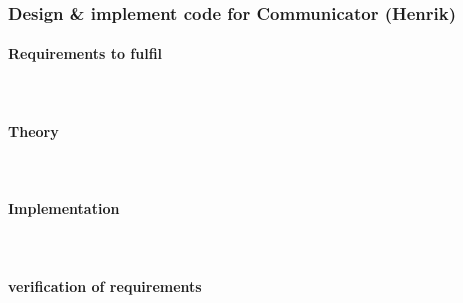 
\subsubsection{Design \& implement code for Communicator (Henrik)}
\paragraph{Requirements to fulfil}\mbox{}\\


\paragraph{Theory}\mbox{}\\


\paragraph{Implementation}\mbox{}\\


\paragraph{verification of requirements}\mbox{}\\

